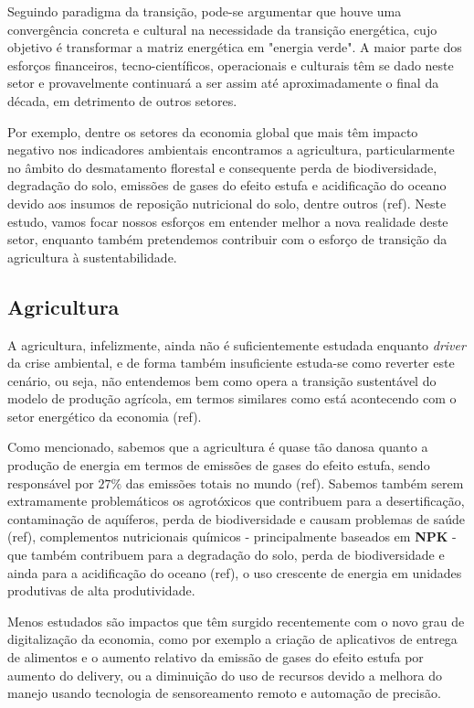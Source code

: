 \documentclass[14pt,a4paper]{article}
\begin{document}
	Seguindo paradigma da transição, pode-se argumentar que houve uma convergência concreta e cultural na necessidade da transição energética, cujo objetivo é transformar a matriz energética em "energia verde". A maior parte dos esforços financeiros, tecno-científicos, operacionais e culturais têm se dado neste setor e provavelmente continuará a ser assim até aproximadamente o final da década, em detrimento de outros setores. 
	
	Por exemplo, dentre os setores da economia global que mais têm impacto negativo nos indicadores ambientais encontramos a agricultura, particularmente no âmbito do desmatamento florestal e consequente perda de biodiversidade, degradação do solo, emissões de gases do efeito estufa e acidificação do oceano devido aos insumos de reposição nutricional do solo, dentre outros (ref). Neste estudo, vamos focar nossos esforços em entender melhor a nova realidade deste setor, enquanto também pretendemos contribuir com o esforço de transição da agricultura à sustentabilidade.

	\subsection{Agricultura}
	
		A agricultura, infelizmente, ainda não é suficientemente estudada enquanto \textit{driver} da crise ambiental, e de forma também insuficiente estuda-se como reverter este cenário, ou seja, não entendemos bem como opera a transição sustentável do modelo de produção agrícola, em termos similares como está acontecendo com o setor energético da economia (ref). 
		
		Como mencionado, sabemos que a agricultura é quase tão danosa quanto a produção de 
		energia em termos de emissões de gases do efeito estufa, sendo responsável por $27\%$ das emissões totais no mundo (ref). Sabemos também serem extramamente problemáticos os agrotóxicos que contribuem para a desertificação, contaminação de aquíferos, perda de biodiversidade e causam problemas de saúde (ref), complementos nutricionais químicos - principalmente baseados em \textbf{NPK} - que também contribuem para a degradação do solo, perda de biodiversidade e ainda para a acidificação do oceano (ref), o uso crescente de energia em unidades produtivas de alta produtividade.
		
		Menos estudados são impactos que têm surgido recentemente com o novo grau de digitalização da economia, como por exemplo a criação de aplicativos de entrega de alimentos e o aumento relativo da emissão de gases do efeito estufa por aumento do delivery, ou a diminuição do uso de recursos devido a melhora do manejo usando tecnologia de sensoreamento remoto e automação de precisão.
		
\end{document}
